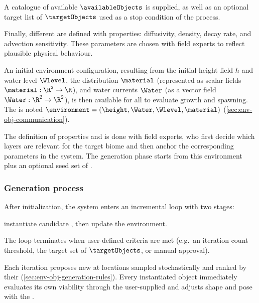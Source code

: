 A catalogue of available  $\availableObjects$ is supplied, as well as an optional target list of  $\targetObjects$ used as a stop condition of the process.

Finally, different  are defined with properties: diffusivity, density, decay rate, and advection sensitivity. These parameters are chosen with field experts to reflect plausible physical behaviour.

An initial environment configuration, resulting from the initial height field $h$ and water level $\Wlevel$, the  distribution $\material$ (represented as scalar fields $\material: \R^2 \to \R$), and water currents $\Water$ (as a vector field $\Water: \R^2 \to \R^2$), is then available for all  to evaluate growth and spawning. The  is noted $\environment = (\height, \Water, \Wlevel, \material)$ (\cref{sec:env-obj-communication}).

The definition of  properties and  is done with field experts, who first decide which  layers are relevant for the target biome and then anchor the corresponding parameters in the system.
The generation phase starts from this environment plus an optional seed set of .

\subsubsection{Generation process}

After initialization, the system enters an incremental loop with two stages:
\begin{Itemize}
    \Item{} instantiate candidate , then
    \Item{} update the environment.
\end{Itemize}
The loop terminates when user-defined criteria are met (e.g.\ an iteration count threshold, the target set of  $\targetObjects$, or manual approval).


Each iteration proposes new  at locations sampled stochastically and ranked by their  (\cref{sec:env-obj-generation-rules}).
Every instantiated object immediately evaluates its own viability through the user-supplied  and adjusts shape and pose with the .


